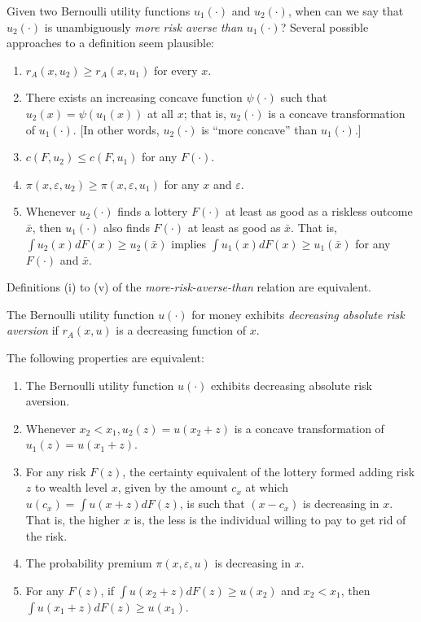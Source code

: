 \begin{defn*}
    Given two Bernoulli utility functions $u_1(\cdot)$ and $u_2(\cdot)$, when can we say that $u_2(\cdot)$ is unambiguously \emph{more risk averse than} $u_1(\cdot)$? Several possible approaches to a definition seem plausible:
    \begin{enumerate}
        \item $r_A(x, u_2) \geq r_A(x, u_1)$ for every $x$.
        \item There exists an increasing concave function $\psi(\cdot)$ such that $u_2(x) = \psi(u_1(x))$ at all $x$; that is, $u_2(\cdot)$ is a concave transformation of $u_1(\cdot)$. [In other words, $u_2(\cdot)$ is ``more concave'' than $u_1(\cdot)$.]
        \item $c(F, u_2) \leq c(F, u_1)$ for any $F(\cdot)$.
        \item $\pi(x, \varepsilon, u_2) \geq \pi(x, \varepsilon, u_1)$ for any $x$ and $\varepsilon$.
        \item Whenever $u_2(\cdot)$ finds a lottery $F(\cdot)$ at least as good as a riskless outcome $\bar{x}$, then $u_1(\cdot)$ also finds $F(\cdot)$ at least as good as $\bar{x}$. That is, $\int u_2(x) dF(x) \geq u_2(\bar{x})$ implies $\int u_1(x) dF(x) \geq u_1(\bar{x})$ for any $F(\cdot)$ and $\bar{x}$.
    \end{enumerate}
\end{defn*}

\begin{prop}
    Definitions (i) to (v) of the \emph{more-risk-averse-than} relation are equivalent.
\end{prop}

\begin{defn}
    The Bernoulli utility function $u(\cdot)$ for money exhibits \emph{decreasing absolute risk aversion} if $r_A(x, u)$ is a decreasing function of $x$.
\end{defn}

\begin{prop}
    The following properties are equivalent:
    \begin{enumerate}
        \item The Bernoulli utility function $u(\cdot)$ exhibits decreasing absolute risk aversion.
        \item Whenever $x_2 < x_1, u_2(z) = u(x_2 + z)$ is a concave transformation of $u_1(z) = u(x_1 + z)$.
        \item For any risk $F(z)$, the certainty equivalent of the lottery formed adding risk $z$ to wealth level $x$, given by the amount $c_x$ at which $u(c_x) = \int u(x + z) dF(z)$, is such that $(x - c_x)$ is decreasing in $x$. That is, the higher $x$ is, the less is the individual willing to pay to get rid of the risk.
        \item The probability premium $\pi(x, \varepsilon, u)$ is decreasing in $x$.
        \item For any $F(z)$, if $\int u(x_2 + z) dF(z) \geq u(x_2)$ and $x_2 < x_1$, then $\int u(x_1 + z) dF(z) \geq u(x_1)$.
    \end{enumerate}
\end{prop}

